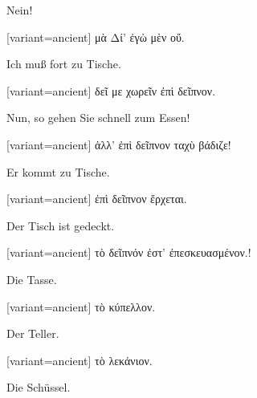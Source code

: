 Nein!

\switchcolumn

\begin{greek}[variant=ancient]%
μὰ Δί' ἐγὼ μὲν οὔ.

\end{greek}%
\switchcolumn*

Ich muß fort zu Tische.

\switchcolumn

\begin{greek}[variant=ancient]%
δεῖ με χωρεῖν ἐπὶ δεῖπνον.

\end{greek}%
\switchcolumn*

Nun, so gehen Sie schnell zum Essen!

\switchcolumn

\begin{greek}[variant=ancient]%
ἀλλ' ἐπὶ δεῖπνον ταχὺ βάδιζε!

\end{greek}%
\switchcolumn*

Er kommt zu Tische.

\switchcolumn

\begin{greek}[variant=ancient]%
ἐπὶ δεῖπνον ἔρχεται.

\end{greek}%
\switchcolumn*

Der Tisch ist gedeckt.

\switchcolumn

\begin{greek}[variant=ancient]%
τὸ δεῖπνόν ἐστ' ἐπεσκευασμένον.!

\end{greek}%
\switchcolumn*

Die Tasse.

\switchcolumn

\begin{greek}[variant=ancient]%
τὸ κύπελλον.

\end{greek}%
\switchcolumn*

Der Teller.

\switchcolumn

\begin{greek}[variant=ancient]%
τὸ λεκάνιον.

\end{greek}%
\switchcolumn*

Die Schüssel.

\switchcolumn


